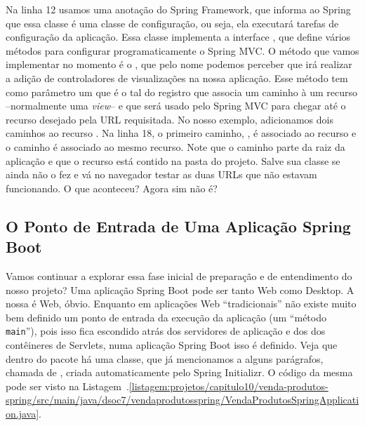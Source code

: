 Na linha 12 usamos uma anotação  do Spring Framework, que informa ao Spring que essa classe é uma classe de configuração, ou seja, ela executará tarefas de configuração da aplicação. Essa classe implementa a interface , que define vários métodos para configurar programaticamente o Spring MVC. O método que vamos implementar no momento é o , que pelo nome podemos perceber que irá realizar a adição de controladores de visualizações na nossa aplicação. Esse método tem como parâmetro um  que é o tal do registro que associa um caminho à um recurso --normalmente uma \textit{view}-- e que será usado pelo Spring MVC para chegar até o recurso desejado pela URL requisitada. No nosso exemplo, adicionamos dois caminhos ao recurso . Na linha 18, o primeiro caminho, , é associado ao recurso  e o caminho  é associado ao mesmo recurso. Note que o caminho parte da raiz da aplicação e que o recurso está contido na pasta  do projeto. Salve sua classe se ainda não o fez e vá no navegador testar as duas URLs que não estavam funcionando. O que aconteceu? Agora sim não é?


\subsection{O Ponto de Entrada de Uma Aplicação Spring Boot}

Vamos continuar a explorar essa fase inicial de preparação e de entendimento do nosso projeto? Uma aplicação Spring Boot pode ser tanto Web como Desktop. A nossa é Web, óbvio. Enquanto em aplicações Web ``tradicionais'' não existe muito bem definido um ponto de entrada da execução da aplicação (um ``método \texttt{main}''), pois isso fica escondido atrás dos servidores de aplicação e dos dos contêineres de Servlets, numa aplicação Spring Boot isso é definido. Veja que dentro do pacote  há uma classe, que já mencionamos a alguns parágrafos, chamada de , criada automaticamente pelo Spring Initializr. O código da mesma pode ser visto na Listagem~\thechapter.\ref{listagem:projetos/capitulo10/venda-produtos-spring/src/main/java/dsoc7/vendaprodutosspring/VendaProdutosSpringApplication.java}.


